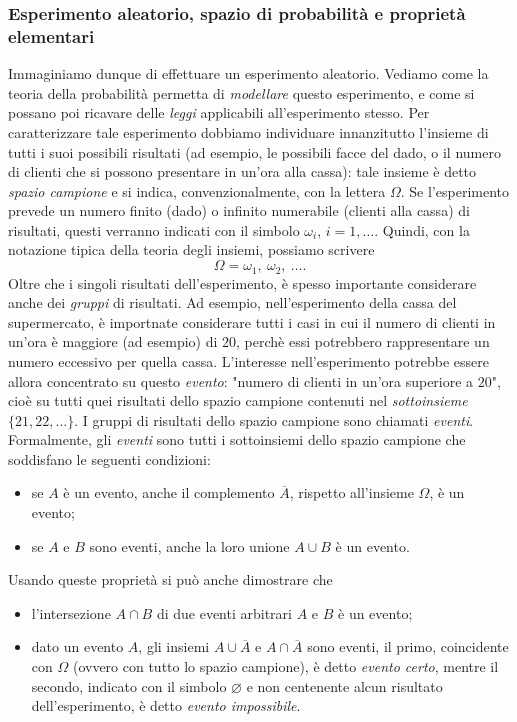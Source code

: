 \documentclass[12pt,oneside,openany]{memoir}
\numberwithin{equation}{subsection}
\begin{document}
\subsubsection{Esperimento aleatorio, spazio di probabilit\`a e propriet\`a
elementari}
Immaginiamo dunque di effettuare un esperimento aleatorio. Vediamo come la
teoria della probabilit\`a permetta di \textit{modellare} questo esperimento, e
come si possano poi ricavare delle \textit{leggi} applicabili all'esperimento
stesso. Per caratterizzare tale esperimento dobbiamo individuare innanzitutto
l'insieme di tutti i suoi possibili risultati (ad esempio, le possibili facce
del dado, o il numero di clienti che si possono presentare in un'ora alla
cassa): tale insieme \`e detto \textit{spazio campione} e si indica,
convenzionalmente, con la lettera $\Omega$. Se l'esperimento prevede un numero
finito (dado) o infinito numerabile (clienti alla cassa) di risultati, questi
verranno indicati con il simbolo $\omega_i$, $i = 1, \dots$. Quindi, con la
notazione tipica della teoria degli insiemi, possiamo scrivere \[     \Omega =
{\omega_1, \ \omega_2, \ \dots}. \] Oltre che i singoli risultati
dell'esperimento, \`e spesso importante considerare anche dei \textit{gruppi} di
risultati. Ad esempio, nell'esperimento della cassa del supermercato, \`e
importnate considerare tutti i casi in cui il numero di clienti in un'ora \`e
maggiore (ad esempio) di $20$, perch\`e essi potrebbero rappresentare un numero
eccessivo per quella cassa. L'interesse nell'esperimento potrebbe essere allora
concentrato su questo \textit{evento}: "numero di clienti in un'ora superiore a
$20$", cio\`e su tutti quei risultati dello spazio campione contenuti nel
\textit{sottoinsieme} $\{21, 22, \dots\}$. I gruppi di risultati dello spazio
campione sono chiamati \textit{eventi}. Formalmente, gli \textit{eventi} sono
tutti i sottoinsiemi dello spazio campione che soddisfano le seguenti
condizioni:
\begin{itemize}
    \item se $A$ \`e un evento, anche il complemento $\overline{A}$, rispetto 
        all'insieme $\Omega$, \`e un evento;
    \item se $A$ e $B$ sono eventi, anche la loro unione $A \cup B$ \`e un
        evento.
\end{itemize}
Usando queste propriet\`a si pu\`o anche dimostrare che
\begin{itemize}
    \item l'intersezione $A \cap B$ di due eventi arbitrari $A$ e $B$ \`e un
        evento;
    \item dato un evento $A$, gli insiemi $A \cup \overline{A}$ e $A \cap 
        \overline{A}$ sono eventi, il primo, coincidente con $\Omega$ (ovvero 
        con tutto lo spazio campione), \`e detto \textit{evento certo}, mentre 
        il secondo, indicato con il simbolo $\varnothing$ e non centenente alcun
        risultato dell'esperimento, \`e detto \textit{evento impossibile}.
\end{itemize}
\end{document}
